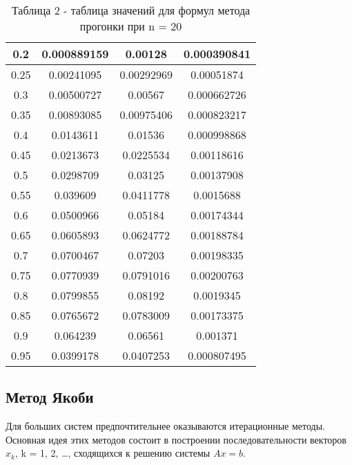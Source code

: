 \documentclass[a4paper,12pt]{article}
\begin{document}
\begin{enumerate}[label = \arabic*.]
{\begin{table}[h]
\begin{tabular}{|c|c|c|c|}
          0.2 &  0.000889159 &      0.00128 &  0.000390841\\ \hline
          0.25 &   0.00241095 &   0.00292969 &   0.00051874\\ \hline
          0.3 &   0.00500727 &      0.00567 &  0.000662726\\ \hline
          0.35 &   0.00893085 &   0.00975406 &  0.000823217\\ \hline
          0.4 &    0.0143611 &      0.01536 &  0.000998868\\ \hline
          0.45 &    0.0213673 &    0.0225534 &   0.00118616\\ \hline
          0.5 &    0.0298709 &      0.03125 &   0.00137908\\ \hline
          0.55 &     0.039609 &    0.0411778 &    0.0015688\\ \hline
          0.6 &    0.0500966 &      0.05184 &   0.00174344\\ \hline
          0.65 &    0.0605893 &    0.0624772 &   0.00188784\\ \hline
          0.7 &    0.0700467 &      0.07203 &   0.00198335\\ \hline
          0.75 &    0.0770939 &    0.0791016 &   0.00200763\\ \hline
          0.8 &    0.0799855 &      0.08192 &    0.0019345\\ \hline
          0.85 &    0.0765672 &    0.0783009 &   0.00173375\\ \hline
          0.9 &     0.064239 &      0.06561 &     0.001371\\ \hline
          0.95 &    0.0399178 &    0.0407253 &  0.000807495\\ \hline
      \end{tabular}
      \caption*{\small{Таблица 2 - таблица значений для формул метода прогонки при n = 20}}
      \end{table}
    }
\end{enumerate}
\newpage



\subsection{Метод Якоби}  

\hspace{0.5cm} Для больших систем предпочтительнее оказываются итерационные методы. Основная идея этих методов состоит 
в построении последовательности векторов $x_k$, k = 1, 2, \dots, сходящихся к решению системы $Ax = b$.
\end{document}
